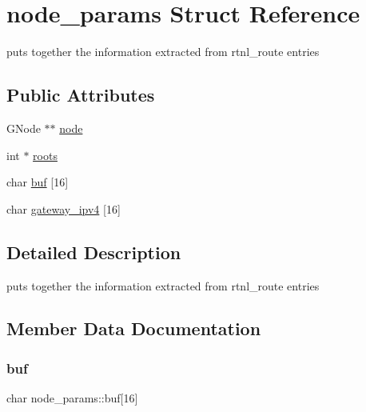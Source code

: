 \hypertarget{structnode__params}{}\section{node\+\_\+params Struct Reference}
\label{structnode__params}


puts together the information extracted from rtnl\+\_\+route entries  


\subsection*{Public Attributes}
\begin{DoxyCompactItemize}
\item 
G\+Node $\ast$$\ast$ \hyperlink{structnode__params_a86b07f6f7d575e6b84723fbe1540771f}{node}
\item 
int $\ast$ \hyperlink{structnode__params_a5a78aaca912a055ee5920a7b222b0fd1}{roots}
\item 
char \hyperlink{structnode__params_a21fbc3409f16b2cbf0e00b76c041081f}{buf} \mbox{[}16\mbox{]}
\item 
char \hyperlink{structnode__params_ad543877faaca7b728c222501f57fb5a3}{gateway\+\_\+ipv4} \mbox{[}16\mbox{]}
\end{DoxyCompactItemize}


\subsection{Detailed Description}
puts together the information extracted from rtnl\+\_\+route entries 

\subsection{Member Data Documentation}
\mbox{\label{structnode__params_a21fbc3409f16b2cbf0e00b76c041081f}} 
\subsubsection{\texorpdfstring{buf}{buf}}
{\footnotesize\ttfamily char node\+\_\+params\+::buf\mbox{[}16\mbox{]}}

\mbox{\label{structnode__params_ad543877faaca7b728c222501f57fb5a3}} 
